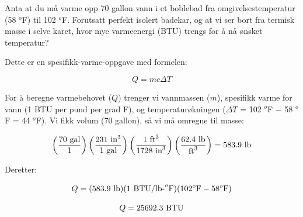 

Anta at du må varme opp 70 gallon vann i et boblebad fra omgivelsestemperatur (58 $^{o}$F) til 102 $^{o}$F. Forutsatt perfekt isolert badekar, og at vi ser bort fra termisk masse i selve karet, hvor mye varmeenergi (BTU) trengs for å nå ønsket temperatur?







Dette er en spesifikk-varme-oppgave med formelen:

$$Q = mc \Delta T$$

For å beregne varmebehovet ($Q$) trenger vi vannmassen ($m$), spesifikk varme for vann (1 BTU per pund per grad F), og temperaturøkningen ($\Delta T$ = 102 $^{o}$F $-$ 58 $^{o}$F = 44 $^{o}$F). Vi fikk volum (70 gallon), så vi må omregne til masse:

$$\left(70 \hbox{ gal} \over 1 \right) \left( 231 \hbox{ in}^3 \over 1 \hbox{ gal} \right) \left(1 \hbox{ ft}^3 \over 1728 \hbox{ in}^3 \right) \left( 62.4 \hbox{ lb} \over \hbox{ft}^3 \right) = 583.9 \hbox{ lb}$$

Deretter:

$$Q = (583.9 \hbox{ lb}) (1 \hbox{ BTU/lb-}^o\hbox{F}) (102^o\hbox{F} - 58^o\hbox{F})$$

$$Q = 25692.3 \hbox{ BTU}$$










